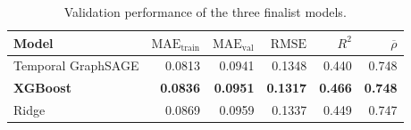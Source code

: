 \begin{table}[!htbp]
\centering
\footnotesize
\caption{Validation performance of the three finalist models.}
\label{tab:finalist-validation-performance}
\begin{tabular}{lrrrrr}
\toprule
Model & $\mathrm{MAE}_{\mathrm{train}}$ & $\mathrm{MAE}_{\mathrm{val}}$ & $\mathrm{RMSE}$ & $R^2$ & $\overline{\rho}$ \\
\midrule
Temporal GraphSAGE & 0.0813 & 0.0941 & 0.1348 & 0.440 & 0.748 \\
\textbf{XGBoost} & \textbf{0.0836} & \textbf{0.0951} & \textbf{0.1317} & \textbf{0.466} & \textbf{0.748} \\
Ridge & 0.0869 & 0.0959 & 0.1337 & 0.449 & 0.747 \\
\bottomrule
\end{tabular}
\end{table}
